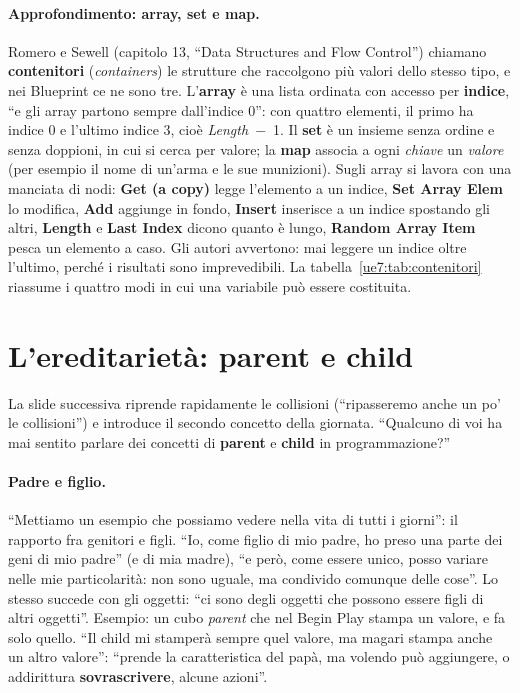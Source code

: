 \paragraph{Approfondimento: array, set e map.} Romero e Sewell (capitolo 13, ``Data
Structures and Flow Control'') chiamano \textbf{contenitori} (\emph{containers}) le
strutture che raccolgono più valori dello stesso tipo, e nei Blueprint ce ne sono tre.
L'\textbf{array} è una lista ordinata con accesso per \textbf{indice}, ``e gli array
partono sempre dall'indice 0'': con quattro elementi, il primo ha indice 0 e l'ultimo
indice 3, cioè \emph{Length}~$-$~1. Il \textbf{set} è un insieme senza ordine e senza
doppioni, in cui si cerca per valore; la \textbf{map} associa a ogni \emph{chiave} un
\emph{valore} (per esempio il nome di un'arma e le sue munizioni). Sugli array si lavora
con una manciata di nodi: \textbf{Get (a copy)} legge l'elemento a un indice,
\textbf{Set Array Elem} lo modifica, \textbf{Add} aggiunge in fondo, \textbf{Insert}
inserisce a un indice spostando gli altri, \textbf{Length} e \textbf{Last Index} dicono
quanto è lungo, \textbf{Random Array Item} pesca un elemento a caso. Gli autori
avvertono: mai leggere un indice oltre l'ultimo, perché i risultati sono imprevedibili.
La tabella~\ref{ue7:tab:contenitori} riassume i quattro modi in cui una variabile può
essere costituita.

\section{L'ereditarietà: parent e child}
\label{ue7:sec:ereditarieta}

La slide successiva riprende rapidamente le collisioni (``ripasseremo anche un po' le
collisioni'') e introduce il secondo concetto della giornata. ``Qualcuno di voi ha mai
sentito parlare dei concetti di \textbf{parent} e \textbf{child} in programmazione?''

\paragraph{Padre e figlio.} ``Mettiamo un esempio che possiamo vedere nella vita di tutti
i giorni'': il rapporto fra genitori e figli. ``Io, come figlio di mio padre, ho preso
una parte dei geni di mio padre'' (e di mia madre), ``e però, come essere unico, posso
variare nelle mie particolarità: non sono uguale, ma condivido comunque delle cose''.
Lo stesso succede con gli oggetti: ``ci sono degli oggetti che possono essere figli di
altri oggetti''. Esempio: un cubo \emph{parent} che nel Begin Play stampa un valore, e
fa solo quello. ``Il child mi stamperà sempre quel valore, ma magari stampa anche un
altro valore'': ``prende la caratteristica del papà, ma volendo può aggiungere, o
addirittura \textbf{sovrascrivere}, alcune azioni''.

